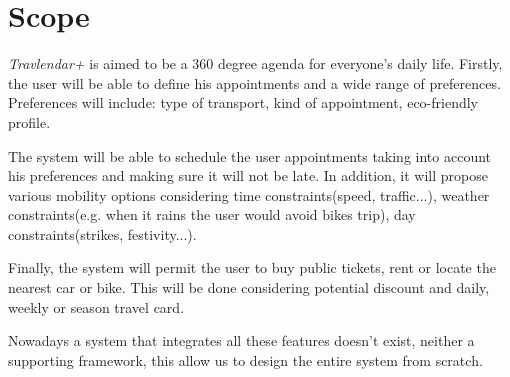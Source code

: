 \section{Scope}

\emph{Travlendar+} is aimed to be a 360 degree agenda for everyone's daily life.
Firstly, the user will be able to define his appointments and a wide range of preferences. Preferences will include: type of transport, kind of appointment, eco-friendly profile.

The system will be able to schedule the user appointments taking into account his preferences and making sure it will not be late. In addition, it will propose various mobility options considering time constraints(speed, traffic...), weather constraints(e.g. when it rains the user would avoid bikes trip), day constraints(strikes, festivity...). 

Finally, the system will permit the user to buy public tickets, rent or locate the nearest car or bike. This will be done considering potential discount and daily, weekly or season travel card.

Nowadays a system that integrates all these features doesn't exist, neither a supporting framework, this allow us to design the entire system from scratch.  